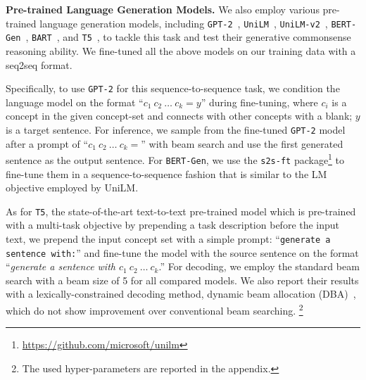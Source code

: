 \documentclass[11pt,a4paper]{article}
\begin{document}
\smallskip
\noindent
\textbf{Pre-trained Language Generation Models.}
We also employ various pre-trained language generation models, including \texttt{GPT-2}~\cite{radford2019language}, \texttt{UniLM}~\cite{Dong2019UnifiedLM},
\texttt{UniLM-v2}~\cite{bao2020unilmv2},
\texttt{BERT-Gen}~\cite{bao2020unilmv2}, 
\texttt{BART}~\cite{Lewis2019BARTDS}, and \texttt{T5}~\cite{raffel2019exploring}, to tackle this task and test their generative commonsense reasoning ability.
We fine-tuned all the above models on our training data with a seq2seq format.

Specifically, to use \texttt{GPT-2} for this sequence-to-sequence task, we condition the language model
on the format ``\textit{$c_1~c_2~\dots~c_k = y$}'' during fine-tuning, where $c_i$ is a concept in the given concept-set and connects with other concepts with a blank; $y$ is a target sentence.
For inference, we sample from the fine-tuned
\texttt{GPT-2} model after a prompt of ``\textit{$c_1~c_2~\dots~c_k =$}'' with beam search and use the first generated
sentence as the output sentence. 
For \texttt{BERT-Gen}, we use the \texttt{s2s-ft} package\footnote{\small{\url{https://github.com/microsoft/unilm}}} to fine-tune them in a sequence-to-sequence fashion that is similar to the LM objective employed by UniLM.

As for \texttt{T5}, the state-of-the-art text-to-text pre-trained model which is pre-trained with a multi-task objective by prepending a task description before the input text, we prepend the input concept set with a simple prompt: ``\texttt{generate a sentence with:}'' and fine-tune the model with the source sentence on the format ``\textit{generate a sentence with $c_1~c_2~\dots~c_k$}.'' For decoding, we employ the standard beam search with a beam size of 5 for all compared models.
We also report their results with a lexically-constrained decoding method, dynamic beam allocation (DBA)~\cite{post-vilar-2018-fast}, which do not show improvement over conventional beam searching.
\footnote{The used hyper-parameters are reported in the appendix. }
\end{document}
